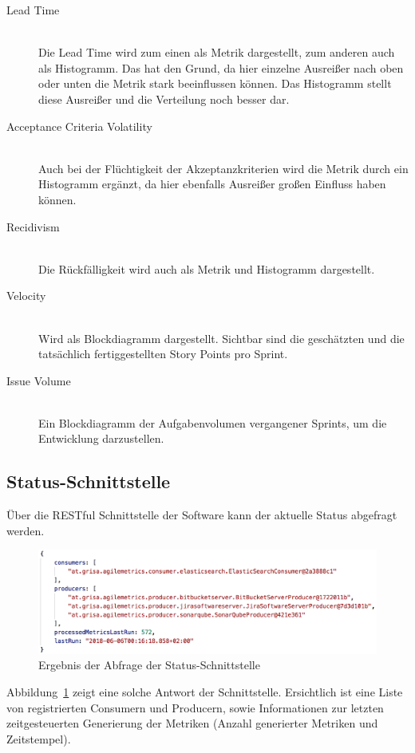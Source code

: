 \clearpage
\begin{description}
    \item[Lead Time] \hfill \\ Die Lead Time wird zum einen als Metrik dargestellt, zum anderen auch als Histogramm. Das hat den Grund, da hier einzelne Ausreißer nach oben oder unten die Metrik stark beeinflussen können. Das Histogramm stellt diese Ausreißer und die Verteilung noch besser dar.
    \item[Acceptance Criteria Volatility] \hfill \\ Auch bei der Flüchtigkeit der Akzeptanzkriterien wird die Metrik durch ein Histogramm ergänzt, da hier ebenfalls Ausreißer großen Einfluss haben können.
    \item[Recidivism] \hfill \\ Die Rückfälligkeit wird auch als Metrik und Histogramm dargestellt.
    \item[Velocity] \hfill \\ Wird als Blockdiagramm dargestellt. Sichtbar sind die geschätzten und die tatsächlich fertiggestellten Story Points pro Sprint.
    \item[Issue Volume] \hfill \\ Ein Blockdiagramm der Aufgabenvolumen vergangener Sprints, um die Entwicklung darzustellen.
\end{description}

\newpage
\subsection{Status-Schnittstelle}

Über die RESTful Schnittstelle der Software kann der aktuelle Status abgefragt werden.

\begin{savenotes}
    \begin{figure}[H] 
        \centering
            \includegraphics[width=1.0\textwidth]{img/status-api.png}
        \caption{Ergebnis der Abfrage der Status-Schnittstelle}\label{fig:status-api}
    \end{figure}
\end{savenotes}

Abbildung~\ref{fig:status-api} zeigt eine solche Antwort der Schnittstelle. 
Ersichtlich ist eine Liste von registrierten Consumern und Producern, sowie Informationen zur letzten zeitgesteuerten Generierung der Metriken (Anzahl generierter Metriken und Zeitstempel).
